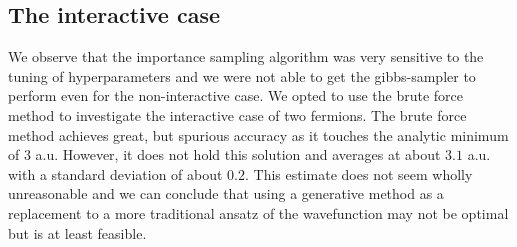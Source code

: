 \subsection{The interactive case}

We observe that the importance sampling algorithm was very sensitive to the tuning of hyperparameters and we were not able to get the gibbs-sampler to perform even for the non-interactive case. 
We opted to use the brute force method to investigate the interactive case of two fermions. 
The brute force method achieves great, but spurious accuracy as it touches the analytic minimum of 3 a.u. 
However, it does not hold this solution and averages at about $3.1$ a.u. with a standard deviation of about $0.2$. 
This estimate does not seem wholly unreasonable and we can conclude that using a generative method as a replacement to a more traditional 
ansatz of the wavefunction may not be optimal but is at least feasible. 
